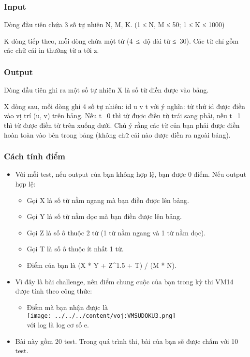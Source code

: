 \subsubsection{Input}

Dòng đầu tiên chứa 3 số tự nhiên N, M, K. (1 ≤ N, M ≤ 50; 1 ≤ K ≤ 1000)

K dòng tiếp theo, mỗi dòng chứa một từ (4 ≤ độ dài từ ≤ 30). Các từ chỉ gồm các chữ cái in thường từ a tới z.

\subsubsection{Output}

Dòng đầu tiên ghi ra một số tự nhiên X là số từ điền được vào bảng.

X dòng sau, mỗi dòng ghi 4 số tự nhiên: id u v t với ý nghĩa: từ thứ id được điền vào vị trí (u, v) trên bảng. Nếu t=0 thì từ được điền từ trái sang phải, nếu t=1 thì từ được điền từ trên xuống dưới. Chú ý rằng các từ của bạn phải được điền hoàn toàn vào bên trong bảng (không chữ cái nào được điền ra ngoài bảng).

\subsubsection{Cách tính điểm}
\begin{itemize}
	\item Với mỗi test, nếu output của bạn không hợp lệ, bạn được 0 điểm. Nếu output hợp lệ:              

 
\begin{itemize}
	\item Gọi X là số từ nằm ngang mà bạn điền được lên bảng.
	\item Gọi Y là số từ nằm dọc mà bạn điền được lên bảng.
	\item Gọi Z là số ô thuộc 2 từ (1 từ nằm ngang và 1 từ nằm dọc).
	\item Gọi T là số ô thuộc ít nhất 1 từ.
	\item Điểm của bạn là (X * Y + Z\textasciicircum1.5 + T) / (M * N).
\end{itemize}
	\item Vì đây là bài challenge, nên điểm chung cuộc của bạn trong kỳ thi VM14 được tính theo công thức:                        


\begin{itemize}
item Giả sử bạn đứng thứ i trong bảng xếp hạng của bài (nghĩa là có i-1 người điểm cao hơn bạn).
	\item Điểm mà bạn nhận được là  
\\
\texttt{[image: ../../../content/voj:VMSUDOKU3.png]}
\\ với log là log cơ số e.
\end{itemize}
	\item Bài này gồm 20 test. Trong quá trình thi, bài của bạn sẽ được chấm với 10 test.                 

 
\begin{itemize}
\end{itemize}
\end{itemize}

